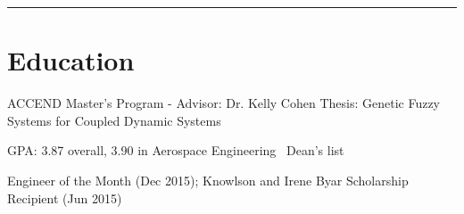 \documentclass[letterpaper]{deedy-resume}
\begin{document}
\begin{minipage}[t]{0.66\textwidth}
\sectionspace
\rule{12cm}{0.5pt}\vspace{2ex}
	\section{Education}
	
	\begin{compactitem}
		\item ACCEND Master's Program - Advisor: Dr. Kelly Cohen
				\subitem Thesis: Genetic Fuzzy Systems for Coupled Dynamic Systems
	\end{compactitem}

    \vspace{1em}
	\location{2013\textendash 2017}
	{}
	
	\begin{compactitem}
		\item GPA: 3.87 overall, 3.90 in Aerospace Engineering \textemdash\ Dean's list
		\item Engineer of the Month (Dec 2015); Knowlson and Irene Byar Scholarship Recipient (Jun 2015)
	\end{compactitem}






\end{minipage}
\end{document}
